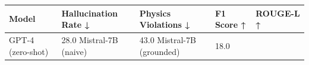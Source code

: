 \begin{tabular}{lllll}
\toprule
Model & Hallucination Rate ↓ & Physics Violations ↓ & F1 Score ↑ & ROUGE-L ↑ \\
\midrule
GPT-4 (zero-shot) & 28.0%
Mistral-7B (naive) & 43.0%
Mistral-7B (grounded) & 18.0%
\bottomrule
\end{tabular}

